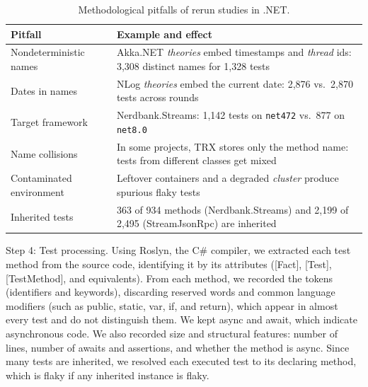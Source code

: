 \begin{table}[!htbp]
\caption{Methodological pitfalls of rerun studies in .NET.}
\label{tab:armadilhas}
\centering
\footnotesize
\renewcommand{\arraystretch}{1.15}
\begin{tabular}{@{}p{}p{}@{}}
\hline\hline
\raggedright \textbf{Pitfall} & \raggedright \textbf{Example and effect} \tabularnewline
\hline
\raggedright Nondeterministic names & \raggedright Akka.NET \emph{theories} embed timestamps and \emph{thread} ids: 3,308 distinct names for 1,328 tests \tabularnewline
\raggedright Dates in names & \raggedright NLog \emph{theories} embed the current date: 2,876 vs.\ 2,870 tests across rounds \tabularnewline
\raggedright Target framework & \raggedright Nerdbank.Streams: 1,142 tests on \texttt{net472} vs.\ 877 on \texttt{net8.0} \tabularnewline
\raggedright Name collisions & \raggedright In some projects, TRX stores only the method name: tests from different classes get mixed \tabularnewline
\raggedright Contaminated environment & \raggedright Leftover containers and a degraded \emph{cluster} produce spurious flaky tests \tabularnewline
\raggedright Inherited tests & \raggedright 363 of 934 methods (Nerdbank.Streams) and 2,199 of 2,495 (StreamJsonRpc) are inherited \tabularnewline
\hline\hline
\end{tabular}
\end{table}

Step 4: Test processing. Using Roslyn, the C\# compiler, we extracted each test method from the source code, identifying it by its attributes ([Fact], [Test], [TestMethod], and equivalents). From each method, we recorded the tokens (identifiers and keywords), discarding reserved words and common language modifiers (such as public, static, var, if, and return), which appear in almost every test and do not distinguish them. We kept async and await, which indicate asynchronous code. We also recorded size and structural features: number of lines, number of awaits and assertions, and whether the method is async. Since many tests are inherited, we resolved each executed test to its declaring method, which is flaky if any inherited instance is flaky.

